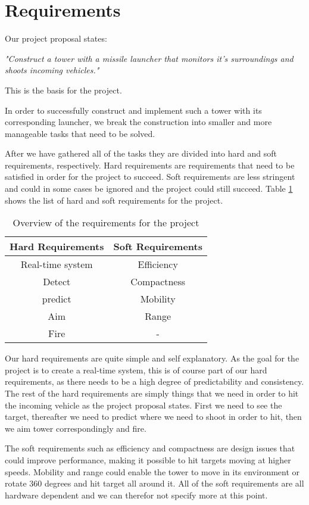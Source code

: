 \section{Requirements}
Our project proposal states: 

\emph{"Construct a tower with a missile launcher that monitors it's surroundings and shoots incoming vehicles."} 

This is the basis for the project.

In order to successfully construct and implement such a tower with its corresponding launcher, we break the construction into smaller and more manageable tasks that need to be solved.

After we have gathered all of the tasks they are divided into hard and soft requirements, respectively. Hard requirements are requirements that need to be satisfied in order for the project to succeed. Soft requirements are less stringent and could in some cases be ignored and the project could still succeed. Table \ref{table:req} shows the list of hard and soft requirements for the project.

\begin{table}[hptb]
\centering
\label{table:req}
\begin{tabular}{ c c}
\textbf{Hard Requirements} & \textbf{Soft Requirements}\\ [0.5ex]
\hline
Real-time system	&   Efficiency\\
Detect				&	Compactness\\
predict 			&	Mobility\\
Aim     			&   Range\\ 
Fire				&	-\\[1ex]
\hline
\end{tabular}
\caption{Overview of the requirements for the project}
\end{table}

Our hard requirements are quite simple and self explanatory. As the goal for the project is to create a real-time system, this is of course part of our hard requirements, as there needs to be a high degree of predictability and consistency. The rest of the hard requirements are simply things that we need in order to hit the incoming vehicle as the project proposal states. First we need to see the target, thereafter we need to predict where we need to shoot in order to hit, then we aim tower correspondingly and fire. 

The soft requirements such as efficiency and compactness are design issues that could improve performance, making it possible to hit targets moving at higher speeds. Mobility and range could enable the tower to move in its environment or rotate 360 degrees and hit target all around it. All of the soft requirements are all hardware dependent and we can therefor not specify more at this point.